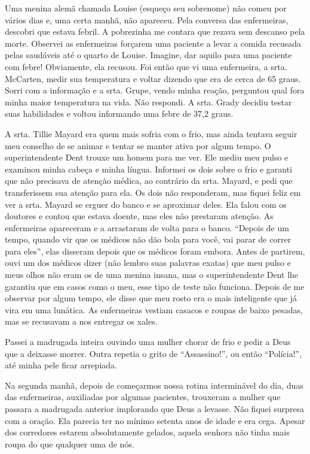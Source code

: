 Uma menina alemã chamada Louise (esqueço seu sobrenome) não comeu por
vários dias e, uma certa manhã, não apareceu. Pela conversa das
enfermeiras, descobri que estava febril. A pobrezinha me contara que
rezava sem descanso pela morte. Observei as enfermeiras forçarem uma
paciente a levar a comida recusada pelas saudáveis até o quarto de
Louise. Imagine, dar aquilo para uma paciente com febre! Obviamente, ela
recusou. Foi então que vi uma enfermeira, a srta. McCarten, medir sua
temperatura e voltar dizendo que era de cerca de 65 graus. Sorri com a
informação e a srta. Grupe, vendo minha reação, perguntou qual fora
minha maior temperatura na vida. Não respondi. A srta. Grady decidiu
testar suas habilidades e voltou informando uma febre de 37,2 graus.

A srta. Tillie Mayard era quem mais sofria com o frio, mas ainda tentava
seguir meu conselho de se animar e tentar se manter ativa por algum
tempo. O superintendente Dent trouxe um homem para me ver. Ele mediu meu
pulso e examinou minha cabeça e minha língua. Informei os dois sobre o
frio e garanti que não precisava de atenção médica, ao contrário da
srta. Mayard, e pedi que transferissem sua atenção para ela. Os dois não
responderam, mas fiquei feliz em ver a srta. Mayard se erguer do banco e
se aproximar deles. Ela falou com os doutores e contou que estava
doente, mas eles não prestaram atenção. As enfermeiras apareceram e a
arrastaram de volta para o banco. ``Depois de um tempo, quando vir
que os médicos não dão bola para você, vai parar de correr para eles'',
elas disseram depois que os médicos foram embora. Antes de partirem,
ouvi um dos médicos dizer (não lembro suas palavras exatas) que meu
pulso e meus olhos não eram os de uma menina insana, mas o
superintendente Dent lhe garantiu que em casos como o meu, esse tipo de
teste não funciona. Depois de me observar por algum tempo, ele disse que
meu rosto era o mais inteligente que já vira em uma lunática. As
enfermeiras vestiam casacos e roupas de baixo pesadas, mas se recusavam
a nos entregar os xales.

Passei a madrugada inteira ouvindo uma mulher chorar de frio e pedir a
Deus que a deixasse morrer. Outra repetia o grito de ``Assassino!'', ou
então ``Polícia!'', até minha pele ficar arrepiada.

Na segunda manhã, depois de começarmos nossa rotina interminável do dia,
duas das enfermeiras, auxiliadas por algumas pacientes, trouxeram a
mulher que passara a madrugada anterior implorando que Deus a levasse.
Não fiquei surpresa com a oração. Ela parecia ter no mínimo setenta anos
de idade e era cega. Apesar dos corredores estarem absolutamente
gelados, aquela senhora não tinha mais roupa do que qualquer uma de nós.


